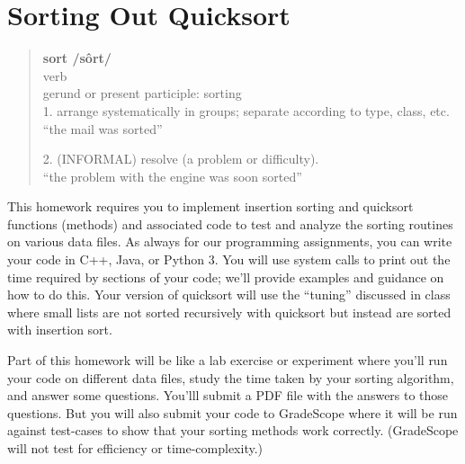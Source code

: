 \documentclass[11pt]{article}
\begin{document}
\section*{Sorting Out Quicksort}



\begin{quote}
\textbf{sort  /sôrt/ }\\
verb \\
gerund or present participle: sorting \\
1. arrange systematically in groups; separate according to type, class, etc. \\
``the mail was sorted''

2. (INFORMAL) resolve (a problem or difficulty). \\
``the problem with the engine was soon sorted''
\end{quote}

This homework requires you to implement insertion sorting and quicksort functions (methods) and associated code to test and analyze the sorting routines on various data files. As always for our programming assignments, you can write your code in C++, Java, or Python 3. You will use system calls to print out the time required by sections of your code; we'll provide examples and guidance on how to do this.  Your version of quicksort will use the ``tuning'' discussed in class where small lists are not sorted recursively with quicksort but instead are sorted with insertion sort.

Part of this homework will be like a lab exercise or experiment where you'll run your code on different data files, study the time taken by your sorting algorithm, and answer some questions.  You'lll submit a PDF file with the answers to those questions.   But you will also submit your code to GradeScope where it will be run against test-cases to show that your sorting methods work correctly.  (GradeScope will not test for efficiency or time-complexity.)
\end{document}
